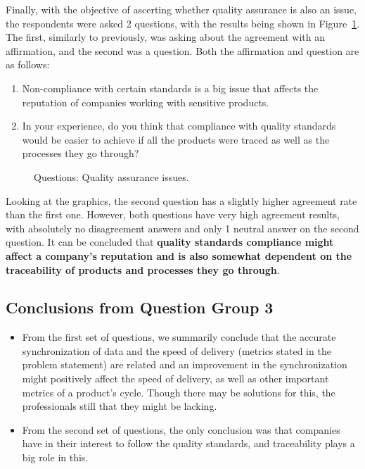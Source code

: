 Finally, with the objective of ascerting whether quality assurance is also an issue, the respondents were asked 2 questions, with the results being shown in Figure~\ref{fig:group3_quality}. The first, similarly to previously, was asking about the agreement with an affirmation, and the second was a question.  Both the affirmation and question are as follows:

\begin{enumerate}
  \item Non-compliance with certain standards is a big issue that affects the reputation of companies working with sensitive products.
  \item In your experience, do you think that compliance with quality standards would be easier to achieve if all the products were traced as well as the processes they go through?
\end{enumerate}

\begin{figure}[h]

    \caption{Questions: Quality assurance issues.}
  \label{fig:group3_quality}
\end{figure}

Looking at the graphics, the second question has a slightly higher agreement rate than the first one. However, both questions have very high agreement results, with absolutely no disagreement answers and only 1 neutral answer on the second question. It can be concluded that \textbf{quality standards compliance might affect a company's reputation and is also somewhat dependent on the traceability of products and processes they go through}.


\subsection*{Conclusions from Question Group 3}

\begin{itemize}
  \item From the first set of questions, we summarily conclude that the accurate synchronization of data and the speed of delivery (metrics stated in the problem statement) are related and an improvement in the synchronization might positively affect the speed of delivery, as well as other important metrics of a product's cycle. Though there may be solutions for this, the professionals still that they might be lacking.

  \item From the second set of questions, the only conclusion was that companies have in their interest to follow the quality standards, and traceability plays a big role in this.
\end{itemize}

